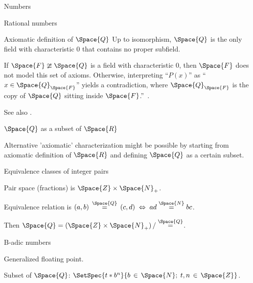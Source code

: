 \begin{plSection}{Numbers}
\begin{plSection}{Rational numbers}
\begin{plSection}{Axiomatic definition of \texorpdfstring{$\Space{Q}$}{Q}}
Up to isomorphism, 
$ \Space{Q} $ is the only field with characteristic $ 0 $ 
that contains no proper subfield.

If $ \Space{F} \ncong \Space{Q} $ is 
a field with characteristic $ 0 $, 
then $ \Space{F} $ does not model this set of axioms. 
Otherwise, interpreting “$ P(x) $” as 
“$ x \in \Space{Q}_{\Space{F}} $” yields a contradiction, 
where $ \Space{Q}_{\Space{F}} $ is the copy of $ \Space{Q} $ 
sitting inside 
$ \Space{F} $.''~\cite{HaskellCurry:2012:RationalAxioms}.

See also \cite{Lawrence:2017:Rationals}.

\end{plSection}%
\begin{plSection}{\texorpdfstring{$\Space{Q}$}{Q}
as a subset of 
\texorpdfstring{$\Space{R}$}{R}}
\label{sec:Q_subset_of_R}

Alternative 'axiomatic' characterization
might be possible by starting from axiomatic definition of
$\Space{R}$ and defining $\Space{Q}$ as a certain subset.

\end{plSection}%
\begin{plSection}{Equivalence classes of integer pairs}
\label{sec:Equivalence_classes_of_integer_pairs}

Pair space (fractions) is $\Space{Z} \times \Space{N}_{+}$.

Equivalence relation is 
$(a,b) \, \overset{\Space{Q}}{=} \, (c,d) 
\; \Leftrightarrow \; 
ad \overset{\Space{N}}{=} bc$.

Then 
$\Space{Q} = 
(\Space{Z} \times \Space{N}_{+}) 
\, / 
\overset{\Space{Q}}{=}$.

\end{plSection}%
\end{plSection}%
\begin{plSection}{B-adic numbers}
\label{Sec:b_adic_numbers}

Generalized floating point.

Subset of $\Space{Q}$:
$\SetSpec{t \ast b^n}{ b\,\in\,\Space{N};\; t,n\,\in\,\Space{Z}}$.


\end{plSection}
\end{plSection}

